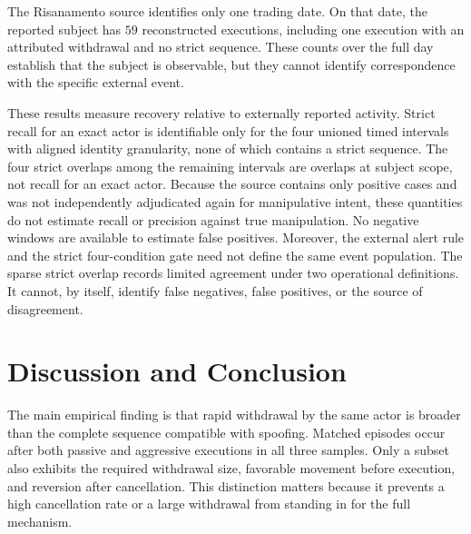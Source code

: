 \documentclass[11pt]{article}
\newenvironment{review}{\begingroup\color{blue}}{\endgroup}
\begin{document}
The Risanamento source identifies only one trading date. On that date, the reported subject has $59$ reconstructed
executions, including one execution with an attributed withdrawal and no strict sequence. \begin{review}These counts over the full day\end{review} establish that the
subject is observable, but they cannot identify correspondence with the specific external event.

These results measure recovery relative to externally reported activity. \begin{review}Strict recall for an exact actor is identifiable only for the four unioned timed intervals with aligned identity granularity, none of which contains a strict sequence.\end{review} The four strict overlaps among
the remaining intervals are \begin{review}overlaps at subject scope, not recall for an exact actor\end{review}. Because \begin{review}the source contains only positive cases and was not independently adjudicated again for manipulative intent\end{review}, these quantities do not estimate recall or precision against true
manipulation. No negative windows are available to estimate false positives. Moreover, the external alert rule and the strict
four-condition gate need not define the same event population. The sparse strict overlap records limited agreement under two
operational definitions. It cannot, by itself, identify false negatives, false positives, or the source of disagreement.
\FloatBarrier

\section{Discussion and Conclusion}
\label{sec:discussion_conclusion}

The main empirical finding is that \begin{review}rapid withdrawal by the same actor\end{review} is broader than \begin{review}the complete sequence compatible with spoofing\end{review}.
Matched episodes occur after both passive and aggressive executions in all three samples. Only a subset also exhibits the
required withdrawal size, \begin{review}favorable movement before execution\end{review}, and \begin{review}reversion after cancellation\end{review}. This distinction matters
because it prevents a high cancellation rate or a large withdrawal from standing in for the full mechanism.
\end{document}
